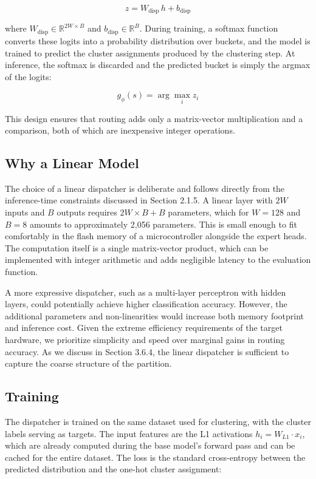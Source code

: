 \[z = W_{\text{disp}} \, h + b_{\text{disp}}\]

where $W_{\text{disp}} \in \mathbb{R}^{2W \times B}$ and $b_{\text{disp}} \in \mathbb{R}^B$. During training, a softmax function converts these logits into a probability distribution over buckets, and the model is trained to predict the cluster assignments produced by the clustering step. At inference, the softmax is discarded and the predicted bucket is simply the argmax of the logits:

\[g_\phi(s) = \arg\max_i z_i\]

This design ensures that routing adds only a matrix-vector multiplication and a comparison, both of which are inexpensive integer operations.


\subsection{Why a Linear Model}

The choice of a linear dispatcher is deliberate and follows directly from the inference-time constraints discussed in Section 2.1.5. A linear layer with $2W$ inputs and $B$ outputs requires $2W \times B + B$ parameters, which for $W=128$ and $B=8$ amounts to approximately 2,056 parameters. This is small enough to fit comfortably in the flash memory of a microcontroller alongside the expert heads. The computation itself is a single matrix-vector product, which can be implemented with integer arithmetic and adds negligible latency to the evaluation function.

A more expressive dispatcher, such as a multi-layer perceptron with hidden layers, could potentially achieve higher classification accuracy. However, the additional parameters and non-linearities would increase both memory footprint and inference cost. Given the extreme efficiency requirements of the target hardware, we prioritize simplicity and speed over marginal gains in routing accuracy. As we discuss in Section 3.6.4, the linear dispatcher is sufficient to capture the coarse structure of the partition.


\subsection{Training}

The dispatcher is trained on the same dataset used for clustering, with the cluster labels serving as targets. The input features are the L1 activations $h_i = W_{L1} \cdot x_i$, which are already computed during the base model's forward pass and can be cached for the entire dataset. The loss is the standard cross-entropy between the predicted distribution and the one-hot cluster assignment:

